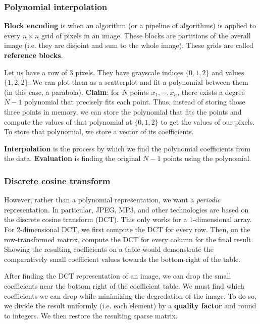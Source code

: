 \documentclass[titlepage, 12pt, leqno]{article}
\begin{document}
\subsubsection{Polynomial interpolation}

\begin{definition}
    \textbf{Block encoding} is when an algorithm (or a pipeline of algorithms) is
    applied to every $n\times n$ grid of pixels in an image. These blocks are
    partitions of the overall image (i.e. they are disjoint and sum to the whole
    image). These grids are called \textbf{reference blocks}.
\end{definition}

Let us have a row of 3 pixels. They have grayscale indices $\{0,1,2\}$ and
values $\{1, 2, 2\}$. We can plot them as a scatterplot and fit a polynomial 
between them (in this case, a parabola). \textbf{Claim}: for $N$ points
$x_{1}, \cdots ,x_{n}$, there exists a degree $N-1$ polynomial that precisely
fits each point. Thus, instead of storing those three points in memory, we can 
store the polynomial that fits the points and compute the values of that
polynomial at $\{0,1,2\}$ to get the values of our pixels. To store that
polynomial, we store a vector of its coefficients.

\begin{definition}
    \textbf{Interpolation} is the process by which we find the polynomial
    coefficients from the data. \textbf{Evaluation} is finding the original
    $N-1$ points using the polynomial.
\end{definition}

\subsubsection{Discrete cosine transform}
However, rather than a polynomial representation, we want a \textit{periodic}
representation. In particular, JPEG, MP3, and other technologies are based on the
discrete cosine transform (DCT). This only works for a 1-dimensional array. For
2-dimensional DCT, we first compute the DCT for every row. Then, on the 
row-transformed matrix, compute the DCT for every column for the final result.
Showing the resulting coefficients on a table would demonstrate the comparatively
small coefficient values towards the bottom-right of the table.

After finding the DCT representation of an image, we can drop the small
coefficients near the bottom right of the coefficient table. We must find which
coefficients we can drop while minimizing the degredation of the image. To do so,
we divide the result uniformly (i.e. each element) by a \textbf{quality factor}
and round to integers. We then restore the resulting sparse matrix.
\end{document}
